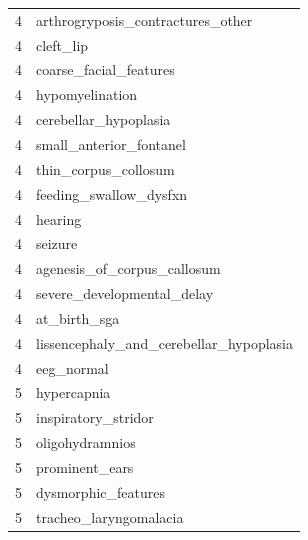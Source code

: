 \documentclass[
  authoryear,
  preprint,
  3p]{elsarticle}
\begin{document}
\begin{longtable}[]{@{}rl@{}}
4 & arthrogryposis\_contractures\_other \\
4 & cleft\_lip \\
4 & coarse\_facial\_features \\
4 & hypomyelination \\
4 & cerebellar\_hypoplasia \\
4 & small\_anterior\_fontanel \\
4 & thin\_corpus\_collosum \\
4 & feeding\_swallow\_dysfxn \\
4 & hearing \\
4 & seizure \\
4 & agenesis\_of\_corpus\_callosum \\
4 & severe\_developmental\_delay \\
4 & at\_birth\_sga \\
4 & lissencephaly\_and\_cerebellar\_hypoplasia \\
4 & eeg\_normal \\
5 & hypercapnia \\
5 & inspiratory\_stridor \\
5 & oligohydramnios \\
5 & prominent\_ears \\
5 & dysmorphic\_features \\
5 & tracheo\_laryngomalacia \\
\bottomrule()
\end{longtable}
\end{document}
